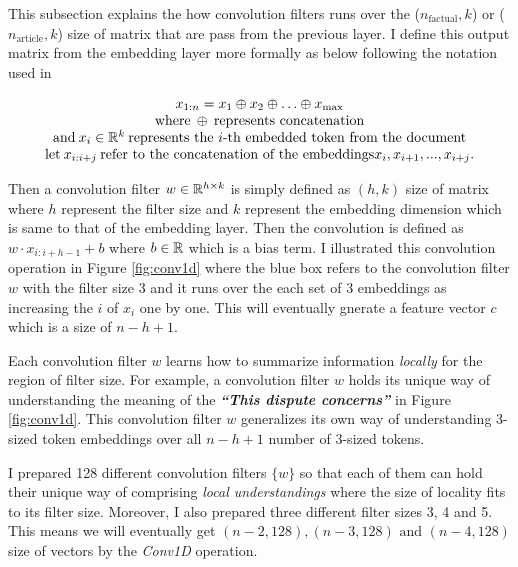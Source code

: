 \documentclass[12pt,letterpaper]{article}
\begin{document}
This subsection explains the how convolution filters runs over the ($n_{\text{factual}}, k$) or ($n_{\text{article}}, k$) size of matrix that are pass from the previous layer.
I define this output matrix from the embedding layer more formally as below following the notation used in \cite{textcnn}

\[
\begin{array}{c}
x_{1:n} = x_1 \oplus x_2 \oplus \ldots \oplus x_{\text{max}}\\
\text{where\:} \oplus \: \text{represents concatenation} \\ 
\text{and} \: x_i \in \Bbb R^k \: \text{represents the $i$-th embedded token from the document}\\
\text{let} \: x_{i:i+j} \: \text{refer to the concatenation of the embeddings} x_i, x_{i+1}, . . . , x_{i+j}.
\end{array}
\]

\noindent Then a convolution filter $w \in \Bbb R^{h \times k}$ is simply defined as $(h, k)$ size of matrix where $h$ represent the filter size and $k$ represent the embedding dimension which is same to that of the embedding layer.
Then the convolution is defined as $w \cdot x_{i:i+h-1} + b$ where $b \in \Bbb R$ which is a bias term. 
I illustrated this convolution operation in Figure \ref{fig:conv1d} where the blue box refers to the convolution filter $w$ with the filter size 3 and it runs over the 
each set of 3 embeddings as increasing the $i$ of $x_i$ one by one. This will eventually gnerate a feature vector $c$ which is a size of $n-h+1$.

Each convolution filter $w$ learns how to summarize information \textit{locally} for the region of filter size. For example, a convolution filter $w$ holds its unique way of 
understanding the meaning of the \textit{\textbf{``This dispute concerns''}} in Figure \ref{fig:conv1d}. 
This convolution filter $w$ generalizes its own way of understanding 3-sized token embeddings over all $n-h+1$ number of 3-sized tokens.


I prepared 128 different convolution filters $\{w\}$  so that each of them can hold their unique way of comprising \textit{local understandings} where the size of locality fits to its filter size. 
Moreover, I also prepared three different filter sizes 3, 4 and 5. This means we will eventually get $(n-2, 128), (n-3, 128) \text{ and } (n-4,128)$ size of vectors by the \textit{Conv1D} operation.
\end{document}
